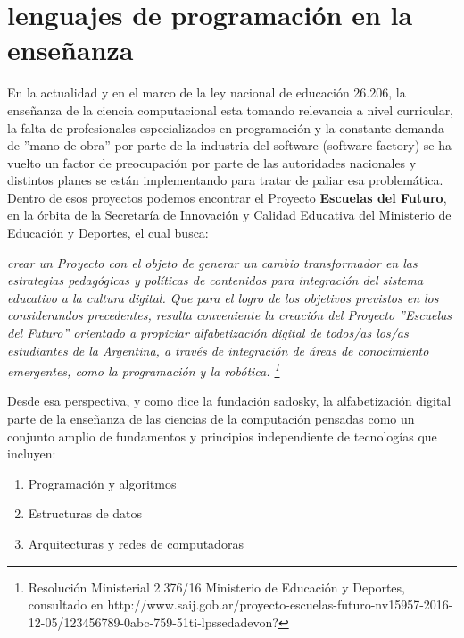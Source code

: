 \section{lenguajes de programación en la enseñanza}

En la actualidad y en el marco de la ley nacional de educación 26.206, la enseñanza de la ciencia computacional esta tomando relevancia a nivel curricular, la falta de profesionales especializados en programación y la constante demanda de ''mano de obra'' por parte de la industria del software (software factory) se ha vuelto un factor de preocupación por parte de las autoridades nacionales y distintos planes se están implementando para tratar de paliar esa problemática. Dentro de esos proyectos podemos encontrar el Proyecto \textbf{Escuelas del Futuro}, en la órbita de la Secretaría de Innovación y Calidad Educativa del Ministerio de Educación y Deportes, el cual busca: 

\begin{center}
\textit{
crear un Proyecto con el objeto de generar un cambio transformador en las estrategias pedagógicas y políticas de contenidos para integración del sistema educativo a la cultura digital.
Que para el logro de los objetivos previstos en los considerandos precedentes, resulta conveniente la creación del Proyecto ''Escuelas del Futuro'' orientado a propiciar alfabetización digital de todos/as los/as estudiantes de la Argentina, a través de integración de áreas de conocimiento emergentes, como la programación y la robótica. \footnote{Resolución Ministerial 2.376/16 Ministerio de Educación y Deportes, consultado en http://www.saij.gob.ar/proyecto-escuelas-futuro-nv15957-2016-12-05/123456789-0abc-759-51ti-lpssedadevon?}
} 
\end{center}

Desde esa perspectiva, y como dice la fundación sadosky, la alfabetización digital parte de la enseñanza de las ciencias de la computación pensadas como un conjunto amplio de fundamentos y principios independiente de tecnologías  \citep[pág 12]{sadosky2013cc} que incluyen:

\begin{enumerate}
  \item Programación y algoritmos
  \item Estructuras de datos
  \item Arquitecturas y redes de computadoras
\end{enumerate}

